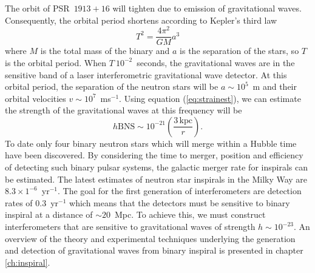 The orbit of PSR~$1913+16$ will tighten due to emission of gravitational waves.
Consequently, the orbital period shortens according to Kepler's third law
\begin{equation}
T^2 = \frac{4\pi^2}{GM}a^3
\end{equation}
where $M$ is the total mass of the binary and $a$ is the separation of the
stars, so $T$ is the orbital period. When $T~10^{-2}$~seconds, the
gravitational waves are in the sensitive band of a laser interferometric
gravitational wave detector.  At this orbital period, the separation of the
neutron stars will be $a \sim 10^5$~m and their orbital velocities
$v \sim 10^7$~ms$^{-1}$. Using equation (\ref{eq:strainest}), we
can estimate the strength of the gravitational waves at this frequency
will be
\begin{equation}
h\mathrm{BNS} \sim 10^{-21}\left( \frac{3\,\mathrm{kpc}}{r} \right).
\label{eq:hbns}
\end{equation}
To date only four binary neutron stars which will
merge within a Hubble time have been discovered.  By considering the
time to merger, position and efficiency of detecting such binary pulsar systems,
the galactic merger rate for inspirals can be estimated\cite{Phinney:1991ei}.
The latest estimates of neutron star inspirals in the Milky Way are $8.3
\times 1^{-6}$~yr$^{-1}$. The goal for the first generation of interferometers
are detection rates of $0.3$~yr$^{-1}$ which means that the detectors must be
sensitive to binary inspiral at a distance of $\sim 20$~Mpc. To achieve this, we
must construct interferometers that are sensitive to gravitational waves of
strength $h \sim 10^{-23}$. An overview of the theory and experimental
techniques underlying the generation and detection of gravitational waves from
binary inspiral is presented in chapter \ref{ch:inspiral}.

